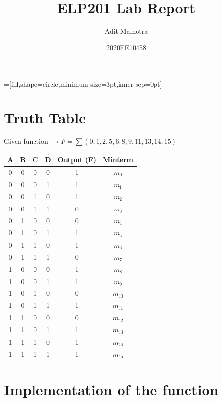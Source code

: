 \documentclass[12pt]{article}
\title{ELP201 Lab Report}
\author{Adit Malhotra}
\date{2020EE10458}
\begin{document}
\maketitle
{}=[fill,shape=circle,minimum size=3pt,inner sep=0pt]
\section{Truth Table}
Given function $\rightarrow F= \sum(0,1,2,5,6,8,9,11,13,14,15)$
\begin{center}
    \begin{tabular}{||c c c c c c||} 
     \hline
     A & B & C & D & Output (F) & Minterm\\ [0.5ex] 
     \hline
     \hline
     0 & 0 & 0 & 0 & 1 & $m_{0}$\\ 
     \hline
     0 & 0 & 0 & 1 & 1 & $m_{1}$\\ 
     \hline
     0 & 0 & 1 & 0 & 1 & $m_{2}$\\ 
     \hline
     0 & 0 & 1 & 1 & 0 & $m_{3}$\\ 
     \hline
     0 & 1 & 0 & 0 & 0 & $m_{4}$\\ 
     \hline
     0 & 1 & 0 & 1 & 1 & $m_{5}$\\
     \hline
     0 & 1 & 1 & 0 & 1 & $m_{6}$\\
     \hline
     0 & 1 & 1 & 1 & 0 & $m_{7}$\\
     \hline
     1 & 0 & 0 & 0 & 1 & $m_{8}$\\ 
     \hline
     1 & 0 & 0 & 1 & 1 & $m_{9}$\\ 
     \hline
     1 & 0 & 1 & 0 & 0 & $m_{10}$\\ 
     \hline
     1 & 0 & 1 & 1 & 1 & $m_{11}$\\ 
     \hline
     1 & 1 & 0 & 0 & 0 & $m_{12}$\\ 
     \hline
     1 & 1 & 0 & 1 & 1 & $m_{13}$\\ 
     \hline
     1 & 1 & 1 & 0 & 1 & $m_{14}$\\ 
     \hline
     1 & 1 & 1 & 1 & 1 & $m_{15}$\\ [1ex] 
     \hline
    \end{tabular}
    \end{center}
\section{Implementation of the function}
\end{document}
